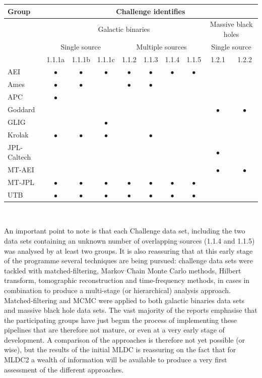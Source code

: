 \documentclass[11pt]{article}
\begin{document}
\begin{center}
\begin{tabular}{l|ccccccccc}
\hline \hline
Group              &    \multicolumn{9}{c}{Challenge identifies} \\
\hline
                   &    \multicolumn{7}{c}{Galactic binaries} & \multicolumn{2}{c}{Massive black holes} \\
                   &    \multicolumn{3}{c}{Single source} & \multicolumn{4}{c}{Multiple sources} & \multicolumn{2}{c}{Single source} \\
                   &    1.1.1a & 1.1.1b  & 1.1.1c & 1.1.2 & 1.1.3 & 1.1.4 & 1.1.5 & 1.2.1 & 1.2.2 \\

AEI             & $\bullet$  &  $\bullet$  &  $\bullet$  &  $\bullet$  &  $\bullet$  &  $\bullet$  &  $\bullet$  &  & \\
Ames              & $\bullet$  &  $\bullet$  &             &  $\bullet$  &  $\bullet$  &   &   &  & \\ 
APC              & $\bullet$  & & & & & &  \\
Goddard           & & & & & & & & $\bullet$  &  $\bullet$ \\ 
GLIG               & & & $\bullet$  & & & & & & \\
Krolak            & $\bullet$  &  $\bullet$  &  $\bullet$  &  &  $\bullet$  &    &   &  & \\ 
JPL-Caltech       & & & & & & & & $\bullet$  & \\
MT-AEI            & & & & & & & & $\bullet$  &  $\bullet$ \\ 
MT-JPL             &  $\bullet$  &    $\bullet$  &    $\bullet$  &    $\bullet$  &    $\bullet$  &    $\bullet$  &  $\bullet$  &  \\
UTB               & $\bullet$  &  $\bullet$  &  $\bullet$  &  $\bullet$  &  $\bullet$  &  $\bullet$  &  $\bullet$  &  & \\
\hline
\end{tabular} \\
\end{center}

An important point to note is that each Challenge data set, including the two data sets containing an unknown number of overlapping sources (1.1.4 and 1.1.5) was analysed by at least two groups. It is also reassuring that at this early stage of the programme several techniques are being pursued: challenge data sets were tackled with matched-filtering, Markov Chain Monte Carlo methods, Hilbert transform, tomographic reconstruction and time-frequency methods, in cases in combination to produce a multi-stage (or hierarchical) analysis approach. Matched-filtering and MCMC were applied to both galactic binaries data sets and massive black hole data sets. The vast majority of the reports emphasise that the participating groups have just begun the process of implementing these pipelines that are therefore not mature, or even at a very early stage of development. A comparison of the approaches is therefore not yet possible (or wise), but the results of the initial MLDC is reassuring on the fact that for MLDC2 a wealth of information will be available to produce a very first assessment of the different approaches.
\end{document}
